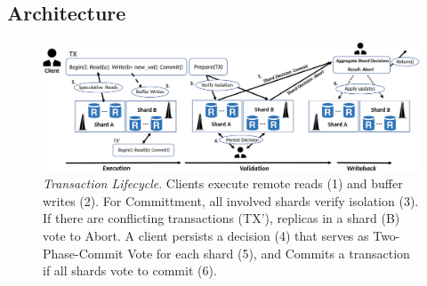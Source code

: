 \subsection{Architecture}
\begin{figure}[!th]
\begin{center}
\includegraphics[width= \textwidth]{./figures/Archi.png}
\end{center}
\caption{{\em Transaction Lifecycle}. Clients execute remote reads (1) and buffer writes (2). For Committment, all involved shards verify isolation (3). If there are conflicting transactions (TX'), replicas in a shard (B) vote to Abort. A client persists a decision (4) that serves as Two-Phase-Commit Vote for each shard (5), and Commits a transaction if all shards vote to commit (6).}
\label{fig:Figure1}
\end{figure}

